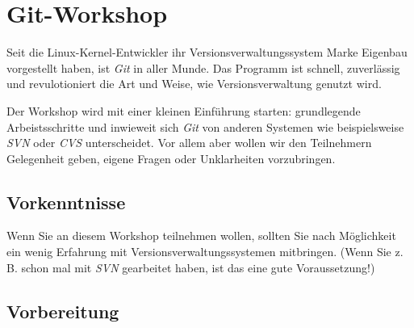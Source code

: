 \documentclass[11pt,            %
               a4paper,         %
               oneside,         %
               DIV12,           %
               fleqn,           %
               smallheadings,   %
               halfparskip,     %
               nochapterprefix, %
               bibtotocnumbered,%
              ]{scrartcl} %
\begin{document}
%
%
%





\section*{Git-Workshop}

Seit die Linux-Kernel-Entwickler ihr Versionsverwaltungssystem Marke
Eigenbau vorgestellt haben, ist \emph{Git} in aller Munde. Das
Programm ist schnell, zuverlässig und revulotioniert die Art und
Weise, wie Versionsverwaltung genutzt wird.

Der Workshop wird mit einer kleinen Einführung starten: grundlegende
Arbeistsschritte und inwieweit sich \emph{Git} von anderen Systemen
wie beispielsweise \emph{SVN} oder \emph{CVS} unterscheidet.
Vor allem aber wollen wir den Teilnehmern Gelegenheit geben, eigene
Fragen oder Unklarheiten vorzubringen.

\subsection*{Vorkenntnisse}

Wenn Sie an diesem Workshop teilnehmen wollen, sollten Sie nach
Möglichkeit ein wenig Erfahrung mit Versionsverwaltungssystemen
mitbringen. (Wenn Sie z.\,B. schon mal mit \emph{SVN} gearbeitet
haben, ist das eine gute Voraussetzung!)

\subsection*{Vorbereitung}
\end{document}
